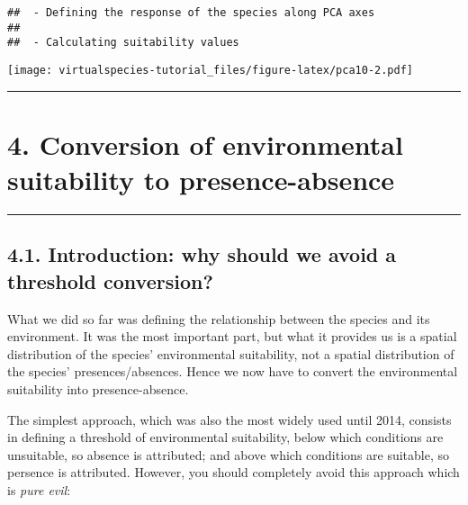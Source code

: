 \documentclass[]{article}
\begin{document}
\begin{verbatim}
##  - Defining the response of the species along PCA axes
## 
##  - Calculating suitability values
\end{verbatim}

\texttt{[image: virtualspecies-tutorial\_files/figure-latex/pca10-2.pdf]}

\begin{center}\rule{0.5\linewidth}{\linethickness}\end{center}

\section{4. Conversion of environmental suitability to
presence-absence}\label{conversion-of-environmental-suitability-to-presence-absence}

\begin{center}\rule{0.5\linewidth}{\linethickness}\end{center}

\setcounter{section}{4} \setcounter{figure}{0}

\subsection{4.1. Introduction: why should we avoid a threshold
conversion?}\label{introduction-why-should-we-avoid-a-threshold-conversion}

What we did so far was defining the relationship between the species and
its environment. It was the most important part, but what it provides us
is a spatial distribution of the species' environmental suitability, not
a spatial distribution of the species' presences/absences. Hence we now
have to convert the environmental suitability into presence-absence.

The simplest approach, which was also the most widely used until 2014,
consists in defining a threshold of environmental suitability, below
which conditions are unsuitable, so absence is attributed; and above
which conditions are suitable, so persence is attributed. However, you
should completely avoid this approach which is \emph{pure evil}:
\end{document}
